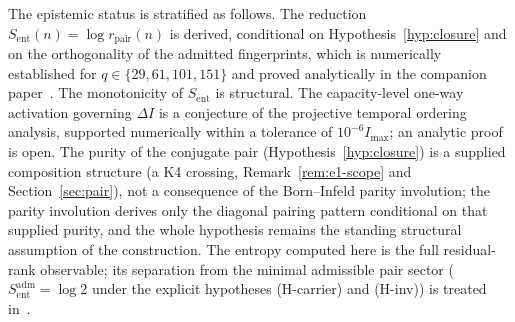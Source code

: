 \documentclass[11pt]{article}
\newcommand{\Sent}{S_{\mathrm{ent}}}
\newcommand{\rpair}{r_{\mathrm{pair}}}
\begin{document}
    The epistemic status is stratified as follows.
    The reduction $\Sent(n)=\log \rpair(n)$ is derived, conditional on Hypothesis~\ref{hyp:closure} and on the
    orthogonality of the admitted fingerprints, which is numerically established for $q\in\{29,61,101,151\}$ and
    proved analytically in the
    companion paper~\cite{Beau2026ent1}.
    The monotonicity of $\Sent$ is structural.
    The capacity-level one-way activation governing $\Delta I$ is a conjecture of the projective temporal
    ordering analysis, supported numerically within a tolerance of $10^{-6} I_{\max}$; an analytic proof is
    open.
    The purity of the conjugate pair (Hypothesis~\ref{hyp:closure}) is a supplied composition structure
    (a K4 crossing, Remark~\ref{rem:e1-scope} and Section~\ref{sec:pair}), not a consequence of the
    Born--Infeld parity involution; the parity involution derives only the diagonal pairing pattern
    conditional on that supplied purity, and the whole hypothesis remains the standing structural
    assumption of the construction.
    The entropy computed here is the full residual-rank observable; its separation from the minimal admissible
    pair sector ($\Sent^{\mathrm{adm}}=\log 2$ under the explicit hypotheses (H-carrier) and (H-inv)) is treated
    in~\cite{Beau2026ent2}.

    \newpage
    
    
\end{document}
